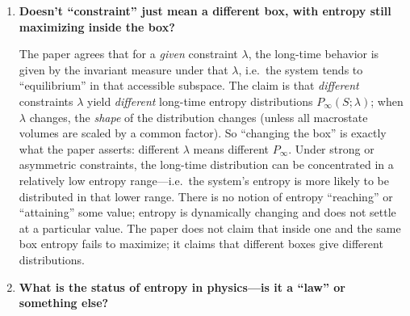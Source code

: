 \documentclass[11pt,a4paper]{article}
\begin{document}
\begin{enumerate}[leftmargin=*]
The paper does not treat the time-reversed trajectory as a ``future the system will actually follow.'' The argument only does the following: if one asserts a \emph{universal} law (``entropy does not decrease for every microstate and every time''), then that statement must also hold when applied to the mirror state $B$ at $t_0$. The \emph{forward} evolution of $B$ is, mathematically, $A$'s past. So one obtains $S_A(t_0-\delta t)\ge S_A(t_0)$ and $S_A(t_0+\delta t)\ge S_A(t_0)$, i.e.\ entropy is a two-sided local minimum at every $t_0$, hence constant along the trajectory---contradicting macroscopic entropy increase. So a \emph{universal} entropy-nondecrease claim is logically incompatible with time-reversal symmetry and must be dropped or qualified. The paper concludes that any one-way statement about $\Delta S$ must depend on additional structure (initial ensemble, coarse-graining, constraints). That is consistent with the view that the arrow of time comes from initial conditions, not from a universal dynamical law.

\item \textbf{Doesn't ``constraint'' just mean a different box, with entropy still maximizing inside the box?}

The paper agrees that for a \emph{given} constraint $\lambda$, the long-time behavior is given by the invariant measure under that $\lambda$, i.e.\ the system tends to ``equilibrium'' in that accessible subspace. The claim is that \emph{different} constraints $\lambda$ yield \emph{different} long-time entropy distributions $P_{\infty}(S;\lambda)$; when $\lambda$ changes, the \emph{shape} of the distribution changes (unless all macrostate volumes are scaled by a common factor). So ``changing the box'' is exactly what the paper asserts: different $\lambda$ means different $P_{\infty}$. Under strong or asymmetric constraints, the long-time distribution can be concentrated in a relatively low entropy range---i.e.\ the system's entropy is more likely to be distributed in that lower range. There is no notion of entropy ``reaching'' or ``attaining'' some value; entropy is dynamically changing and does not settle at a particular value. The paper does not claim that inside one and the same box entropy fails to maximize; it claims that different boxes give different distributions.

\item \textbf{What is the status of entropy in physics---is it a ``law'' or something else?}


\end{enumerate}
\end{document}
